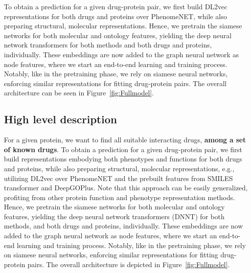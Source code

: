 \documentclass{bioinfo}
\begin{document}
To obtain a prediction for a given drug-protein pair, we first
build DL2vec representations for both drugs and proteins over PhenomeNET, while also preparing structural, molecular representations. Hence, we pretrain the siamese networks for both molecular and ontology features, yielding the deep neural network transformers for both methods and both drugs and proteins, individually. These embeddings are now added to the graph neural network as node features, where we start an end-to-end learning and training process. Notably, like in the pretraining phase, we rely on siamese neural networks, enforcing similar representations for fitting drug-protein pairs. The overall architecture can be seen in Figure~\ref{fig:Fullmodel}.

\subsection{High level description}

For a given protein, we want to find all suitable interacting drugs, \textbf{among a set of known drugs}.
To obtain a prediction for a given drug-protein pair, we first
build representations embodying both phenotypes and functions for both drugs and proteins, while also preparing structural, molecular representations, e.g., utilizing DL2vec over PhenomeNET and the prebuilt features from SMILES transformer and DeepGOPlus. Note that this approach can be easily generalized, profiting from other protein function and phenotype representation methods. \\ 
Hence, we pretrain the siamese networks for both molecular and ontology features, yielding the deep neural network transformers (DNNT) for both methods, and both drugs and proteins, individually. These embeddings are now added to the graph neural network as node features, where we start an end-to-end learning and training process. Notably, like in the pretraining phase, we rely on siamese neural networks, enforcing similar representations for fitting drug-protein pairs. The overall architecture is depicted in Figure~\ref{fig:Fullmodel}.\\
\end{document}

